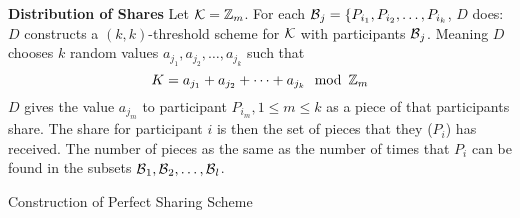 \begin{algorithm}[H]
  \DontPrintSemicolon{}

  \BlankLine{}

  \textbf{Distribution of Shares} \;
  Let $\operatorname{\mathcal{K}} = \operatorname{\mathbb{Z}}_{m}$. \;
  For each $\operatorname{\mathcal{B}}_{j} = \lbrace P_{i_{1}}, P_{i_{2}}, \ldots, P_{i_{k}}$, $D$ does: \;
  $D$ constructs a $(k,k)$-threshold scheme for $\operatorname{\mathcal{K}}$ with participants $\operatorname{\mathcal{B}}_{j}$.
  Meaning $D$ chooses $k$ random values $a_{j_{1}}, a_{j_{2}}, \ldots, a_{j_{k}}$ such that
  \begin{equation*}
    K = a_{j_{1}} + a_{j_{2}} + \cdots + a_{j_{k}} \mod \IntsMod{m}
  \end{equation*} \;
  $D$ gives the value $a_{j_{m}}$ to participant $P_{i_{m}}, 1 \leq m \leq k$ as a piece of that participants share. \;
  The share for participant $i$ is then the set of pieces that they ($P_{i}$)  has received. \;
  The number of pieces as the same as the number of times that $P_{i}$ can be found in the subsets $\operatorname{\mathcal{B}}_{1}, \operatorname{\mathcal{B}}_{2}, \ldots, \operatorname{\mathcal{B}}_{l}$.

  \caption{Construction of Perfect Sharing Scheme}
  \label{algo:Construct_Perfect_Sharing_Scheme}
\end{algorithm}


